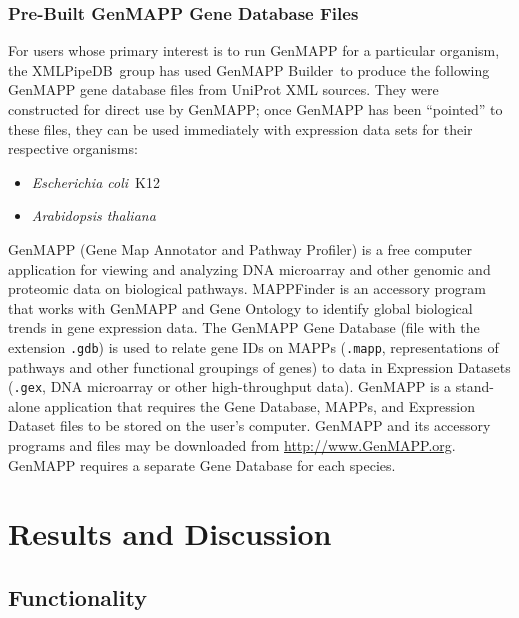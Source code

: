 \documentclass[10pt]{bmc_article}
\newenvironment{bmcformat}{\begin{raggedright}\baselineskip20pt\sloppy\setboolean{publ}{false}}{\end{raggedright}\baselineskip20pt\sloppy}
\def\xmlpipedb{XMLPipeDB}                       %
\def\gmb{GenMAPP Builder}
\def\ecolifull{\emph{Escherichia coli}}
\def\athalianafull{\emph{Arabidopsis thaliana}}
\begin{document}
\begin{bmcformat}
\subsubsection*{Pre-Built GenMAPP Gene Database Files}
\label{gdb}

For users whose primary interest is to run GenMAPP for a particular organism, the \xmlpipedb\ group has used \gmb\ to produce the following GenMAPP gene database files from UniProt XML sources.  They were constructed for direct use by GenMAPP; once GenMAPP has been ``pointed'' to these files, they can be used immediately with expression data sets for their respective organisms:
\begin{itemize}
\item \ecolifull\ K12
\item \athalianafull
\end{itemize}

GenMAPP (Gene Map Annotator and Pathway Profiler) is a free computer application for 
viewing and analyzing DNA microarray and other genomic and proteomic data on biological pathways.   MAPPFinder is an accessory program that works with GenMAPP and Gene Ontology to identify global biological trends in gene expression data. The GenMAPP Gene Database (file with the extension \texttt{.gdb}) is used to relate gene IDs on MAPPs (\texttt{.mapp}, representations of pathways and other functional groupings of genes) to data in Expression Datasets (\texttt{.gex}, DNA microarray or other high-throughput data).  GenMAPP is a stand-alone application that requires the Gene Database, MAPPs, and Expression Dataset files to be 
stored on the user's computer. GenMAPP and its accessory programs and files may be downloaded from \url{http://www.GenMAPP.org}.  GenMAPP requires a separate Gene Database for each species.\pb






\section*{Results and Discussion}

\subsection*{Functionality}


\end{bmcformat}
\end{document}
